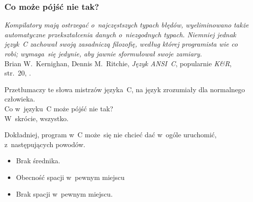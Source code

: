 \documentclass[10pt,t]{beamer}
\begin{document}
\begin{frame}
  \frametitle{Co może pójść nie tak?}


  \textit{Kompilatory mają ostrzegać o~najczęstszych typach błędów,
    wyeliminowano także automatyczne przekształcenia danych o~niezgodnych
    typach. Niemniej jednak język~C zachował swoją zasadniczą filozofię,
    według której programista wie co robi; wymaga~się jedynie, aby jawnie
    sformułował swoje zamiary.} \\
  Brian W.~Kernighan, Dennis M.~Ritchie, \textit{Język ANSI~C}, popularnie
  \textit{K\&R}, str.~20,
  \parencite{Kernighan-Ritchie-Jezyk-ANSI-C-Pub-2004}.

  Przetłumaczy te słowa mistrzów języka~C, na język zrozumiały dla
  normalnego człowieka. \\
  Co w~języku~C może pójść nie tak? \\
  W~skrócie, wszystko.

  Dokładniej, program w~C może~się nie chcieć dać w~ogóle uruchomić,
  z~następujących powodów.

  \vspace{-0.5em}



  \begin{itemize}

  \item Brak średnika.

  \item Obecność spacji w~pewnym miejscu

  \item Brak spacji w~pewnym miejscu.

  \end{itemize}

\end{frame}
\end{document}
